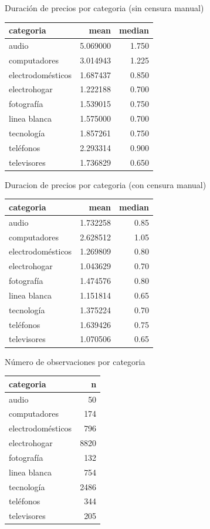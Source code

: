 \documentclass[xcolor=dvipsnames]{beamer}
\begin{document}
\begin{frame}

\centering
Duraci\'on de precios por categoria (sin censura manual)
\begin{tabular}{lrr}
\toprule
categoria & mean & median\\
\midrule
audio & 5.069000 & 1.750\\
computadores & 3.014943 & 1.225\\
electrodomésticos & 1.687437 & 0.850\\
electrohogar & 1.222188 & 0.700\\
fotografía & 1.539015 & 0.750\\
\addlinespace
linea blanca & 1.575000 & 0.700\\
tecnología & 1.857261 & 0.750\\
teléfonos & 2.293314 & 0.900\\
televisores & 1.736829 & 0.650\\
\bottomrule
\end{tabular}
\end{frame}

\begin{frame}
Duracion de precios por categoria (con censura manual)
\centering
\begin{tabular}{lrr}
\toprule
categoria & mean & median\\
\midrule
audio & 1.732258 & 0.85\\
computadores & 2.628512 & 1.05\\
electrodomésticos & 1.269809 & 0.80\\
electrohogar & 1.043629 & 0.70\\
fotografía & 1.474576 & 0.80\\
\addlinespace
linea blanca & 1.151814 & 0.65\\
tecnología & 1.375224 & 0.70\\
teléfonos & 1.639426 & 0.75\\
televisores & 1.070506 & 0.65\\
\bottomrule
\end{tabular}
\end{frame}

\begin{frame}
N\'umero de observaciones por categoria\\
\centering
\begin{tabular}{lr}
\toprule
categoria & n\\
\midrule
audio & 50\\
computadores & 174\\
electrodomésticos & 796\\
electrohogar & 8820\\
fotografía & 132\\
\addlinespace
linea blanca & 754\\
tecnología & 2486\\
teléfonos & 344\\
televisores & 205\\
\bottomrule
\end{tabular}
\end{frame}
\end{document}
